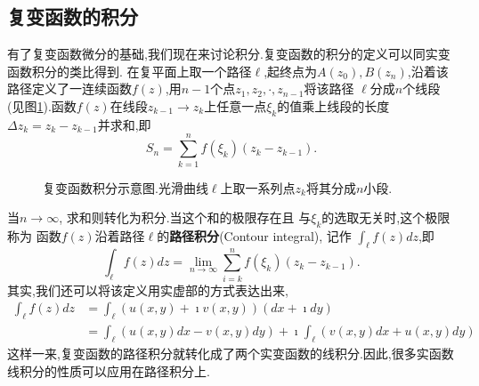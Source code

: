 \subsection[定义和性质]{复变函数的积分}
有了复变函数微分的基础,我们现在来讨论积分.复变函数的积分的定义可以同实变函数积分的类比得到.
在复平面上取一个路径$\ell$,起终点为$A(z_0),B(z_n)$,沿着该路径定义了一连续函数$f(z)$,用$n-1$个点$z_1, z_2,\cdot, z_{n-1}$将该路径
$\ell$分成$n$个线段(见图\ref{fig:complex_integral}).函数$f(z)$在线段$z_{k-1}\rightarrow z_{k}$上任意一点$\xi_k$的值乘上线段的长度$\Delta z_k = z_k - z_{k-1}$并求和,即
\begin{equation}
    S_n = \sum_{k=1}^{n} f(\xi_k) (z_{k} - z_{k-1}) .
\end{equation}
\begin{figure}[htbp]
    \centering
    
    \caption{复变函数积分示意图.光滑曲线$\ell$上取一系列点$z_k$将其分成$n$小段.}
    \label{fig:complex_integral}
\end{figure}
当$n\to \infty$, 求和则转化为积分.当这个和的极限存在且
与$\xi_k$的选取无关时,这个极限称为
函数$f(z)$沿着路径$\ell$的\textbf{路径积分}(Contour integral), 记作
$\int_{\ell} f(z) dz$,即
\begin{equation}
    \int_{\ell} f(z) dz = \lim_{n\to \infty} \sum_{i=k}^{n} f(\xi_k) (z_{k} - z_{k-1}) . 
\end{equation}
其实,我们还可以将该定义用实虚部的方式表达出来,
\begin{align}
    \int_{\ell} f(z) dz  & = \int_{\ell} \left( u(x,y) + \imath v(x,y) \right) (dx + \imath dy) 
    \\
    & = \int_{\ell} \left( u(x,y) dx  -  v(x,y) dy \right) + \imath \int_{\ell}  \left( v(x,y) dx  + u(x,y)dy \right) 
\end{align}
这样一来,复变函数的路径积分就转化成了两个实变函数的线积分.因此,很多实函数线积分的性质可以应用在路径积分上.


